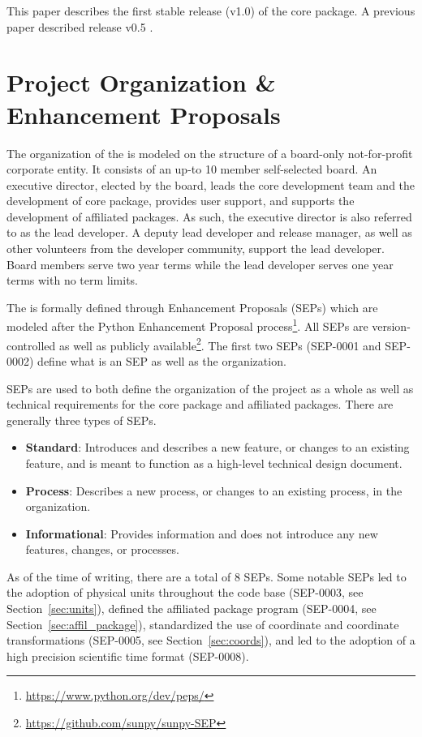 This paper describes the first stable release (v1.0) of the core package.
A previous paper described release v0.5 \citep{Community:2015cy}.

\section{Project Organization \& Enhancement Proposals}

The organization of the \sunpyproj is modeled on the structure of a board-only not-for-profit corporate entity.
It consists of an up-to 10 member self-selected board.
An executive director, elected by the board, leads the core development team and the development of \sunpypkg core package, provides user support, and supports the development of affiliated packages.
As such, the executive director is also referred to as the lead developer.
A deputy lead developer and release manager, as well as other volunteers from the developer community, support the lead developer.
Board members serve two year terms while the lead developer serves one year terms with no term limits.

The \sunpyproj is formally defined through \sunpy Enhancement Proposals (SEPs) which are modeled after the Python Enhancement Proposal process\footnote{\url{https://www.python.org/dev/peps/}}.
All SEPs are version-controlled as well as publicly available\footnote{\url{https://github.com/sunpy/sunpy-SEP}}.
The first two SEPs (SEP-0001 and SEP-0002) define what is an SEP as well as the \sunpy organization.

SEPs are used to both define the organization of the project as a whole as well as technical requirements for the \sunpypkg core package and affiliated packages.
There are generally three types of SEPs.
\begin{itemize}
    \item \textbf{Standard}: Introduces and describes a new feature, or changes to an existing feature, and is meant to function as a high-level technical design document.
    \item \textbf{Process}: Describes a new process, or changes to an existing process, in the organization.
    \item \textbf{Informational}: Provides information and does not introduce any new features, changes, or processes.
\end{itemize}

As of the time of writing, there are a total of 8 SEPs.
Some notable SEPs led to the adoption of physical units throughout the code base (SEP-0003, see Section~\ref{sec:units}), defined the affiliated package program (SEP-0004, see Section~\ref{sec:affil_package}), standardized the use of coordinate and coordinate transformations (SEP-0005, see Section~\ref{sec:coords}), and led to the adoption of a high precision scientific time format (SEP-0008).

